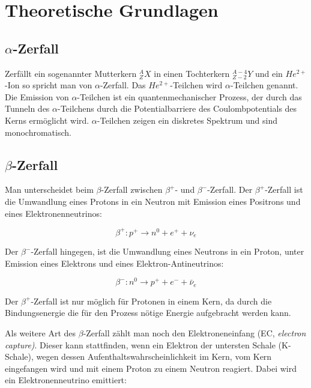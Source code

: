 \section{Theoretische Grundlagen}


\subsection{$\alpha$-Zerfall}

Zerfällt ein sogenannter Mutterkern $_Z^AX$ in einen Tochterkern $_{Z-2}^{A-4}Y$ und ein $He^{2+}$-Ion so spricht man von $\alpha$-Zerfall. Das $He^{2+}$-Teilchen wird $\alpha$-Teilchen genannt. Die Emission von $\alpha$-Teilchen ist ein quantenmechanischer Prozess, der durch das Tunneln des $\alpha$-Teilchens durch die Potentialbarriere des Coulombpotentials des Kerns ermöglicht wird. $\alpha$-Teilchen zeigen ein diskretes Spektrum und sind monochromatisch.  %

\subsection{$\beta$-Zerfall}

Man unterscheidet beim $\beta$-Zerfall zwischen $\beta^+$- und $\beta^-$-Zerfall. Der $\beta^+$-Zerfall ist die Umwandlung eines Protons in ein Neutron mit Emission eines Positrons und eines Elektronenneutrinos:

$$ \beta^+: p^+ \rightarrow n^0 + e^+ + \nu_e $$

Der $\beta^-$-Zerfall hingegen, ist die Umwandlung eines Neutrons in ein Proton, unter Emission eines Elektrons und eines Elektron-Antineutrinos:

$$ \beta^-: n^0 \rightarrow p^+ + e^- + \bar \nu_e $$

Der $\beta^+$-Zerfall ist nur möglich für Protonen in einem Kern, da durch die Bindungsenergie die für den Prozess nötige Energie aufgebracht werden kann. %

Als weitere Art des $\beta$-Zerfall zählt man noch den Elektroneneinfang (EC, \emph{electron capture)}. Dieser kann stattfinden, wenn ein Elektron der untersten Schale (K-Schale), wegen dessen Aufenthaltswahrscheinlichkeit im Kern, vom Kern eingefangen wird und mit einem Proton zu einem Neutron reagiert. Dabei wird ein Elektronenneutrino emittiert:

